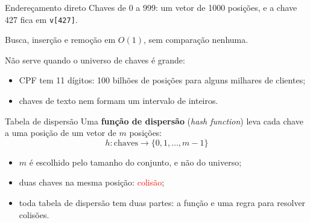 \documentclass{beamer}
\newcommand{\tcr}[1]{\textcolor{red}{#1}}
\begin{document}
\begin{frame}{Endereçamento direto}
	Chaves de 0 a 999: um vetor de 1000 posições, e a chave 427 fica em
	\texttt{v[427]}.

	\vspace{0.3cm}
	\begin{center}
	\end{center}

	\vspace{0.3cm}
	Busca, inserção e remoção em $O(1)$, sem comparação nenhuma.

	\vspace{0.4cm}
	Não serve quando o universo de chaves é grande:
	\begin{itemize}
		\item CPF tem 11 dígitos: 100 bilhões de posições para alguns milhares de
		      clientes;
		\item chaves de texto nem formam um intervalo de inteiros.
	\end{itemize}
\end{frame}

\begin{frame}{Tabela de dispersão}
	Uma \textbf{função de dispersão} (\emph{hash function}) leva cada chave a uma
	posição de um vetor de $m$ posições:
	\[
		h : \text{chaves} \to \{0, 1, \ldots, m-1\}
	\]

	\begin{center}
	\end{center}

	\vspace{0.1cm}
	\begin{itemize}
		\item $m$ é escolhido pelo tamanho do conjunto, e não do universo;
		\item duas chaves na mesma posição: \tcr{colisão};
		\item toda tabela de dispersão tem duas partes: a função e uma regra para
		      resolver colisões.
	\end{itemize}
\end{frame}
\end{document}
